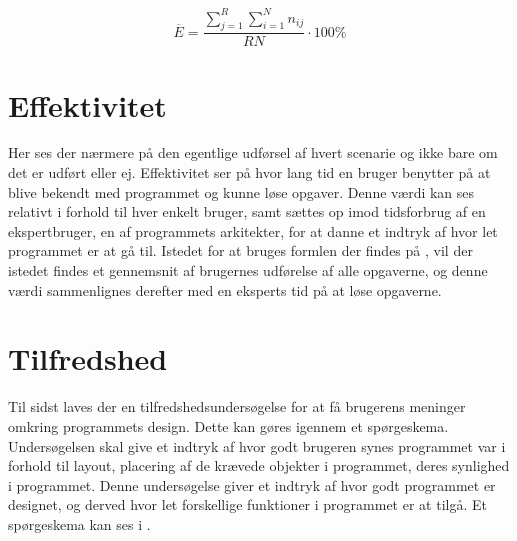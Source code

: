 \begin{equation}\label{FunktionalitetEquation}
\overline{E}=\frac{\sum\limits_{j=1}^{R}\sum\limits_{i=1}^{N}n_{ij}}{RN}\cdot 100\% 
\end{equation}


\section{Effektivitet}
Her ses der nærmere på den egentlige udførsel af hvert scenarie og ikke bare om det er udført eller ej. Effektivitet ser på hvor lang tid en bruger benytter på at blive bekendt med programmet og kunne løse opgaver. Denne værdi kan ses relativt i forhold til hver enkelt bruger, samt sættes op imod tidsforbrug af en ekspertbruger, en af programmets arkitekter, for at danne et indtryk af hvor let programmet er at gå til. Istedet for at bruges formlen der findes på \citep{UIEffeciency}, vil der istedet findes et gennemsnit af brugernes udførelse af alle opgaverne, og denne værdi sammenlignes derefter med en eksperts tid på at løse opgaverne.


\section{Tilfredshed}
Til sidst laves der en tilfredshedsundersøgelse for at få brugerens meninger omkring programmets design. Dette kan gøres igennem et spørgeskema. Undersøgelsen skal give et indtryk af hvor godt brugeren synes programmet var i forhold til layout, placering af de krævede objekter i programmet, deres synlighed i programmet. Denne undersøgelse giver et indtryk af hvor godt programmet er designet, og derved hvor let forskellige funktioner i programmet er at tilgå. Et spørgeskema kan ses i . \citep{UISatisfaction}
